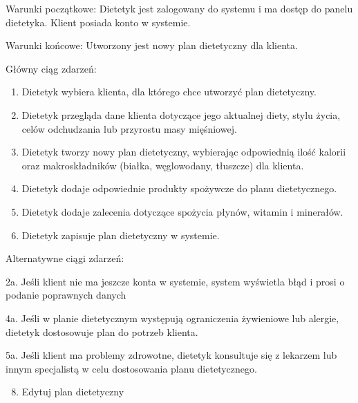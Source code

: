 {Warunki początkowe: Dietetyk jest zalogowany do systemu i ma dostęp do
panelu dietetyka. Klient posiada konto w systemie.}

{Warunki końcowe: Utworzony jest nowy plan dietetyczny dla klienta.}

{Główny ciąg zdarzeń:}

\begin{enumerate}
\tightlist
\item
  {Dietetyk wybiera klienta, dla którego chce utworzyć plan
  dietetyczny.}
\item
  {Dietetyk przegląda dane klienta dotyczące jego aktualnej diety, stylu
  życia, celów odchudzania lub przyrostu masy mięśniowej.}
\item
  {Dietetyk tworzy nowy plan dietetyczny, wybierając odpowiednią ilość
  kalorii oraz makroskładników (białka, węglowodany, tłuszcze) dla
  klienta.}
\item
  {Dietetyk dodaje odpowiednie produkty spożywcze do planu
  dietetycznego.}
\item
  {Dietetyk dodaje zalecenia dotyczące spożycia płynów, witamin i
  minerałów.}
\item
  {Dietetyk zapisuje plan dietetyczny w systemie.}
\end{enumerate}

{Alternatywne ciągi zdarzeń:}

{2a. Jeśli klient nie ma jeszcze konta w systemie, system wyświetla błąd
i prosi o podanie poprawnych danych}

{4a. Jeśli w planie dietetycznym występują ograniczenia żywieniowe lub
alergie, dietetyk dostosowuje plan do potrzeb klienta.}

{5a. Jeśli klient ma problemy zdrowotne, dietetyk konsultuje się z
lekarzem lub innym specjalistą w celu dostosowania planu dietetycznego.}

{}

\begin{enumerate}
\setcounter{enumi}{7}
\tightlist
\item
  {Edytuj plan dietetyczny}
\end{enumerate}

